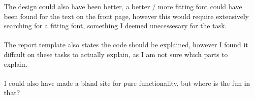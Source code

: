 \documentclass[a4paper]{scrartcl}
\begin{document}
\noindent
The design could also have been better, a better / more fitting font could have been found for the
text on the front page, however this would require extensively searching for a fitting font,
something I deemed unecessesary for the task.\\\\

\noindent
The report template also states the code should be explained, however I found it diffcult
on these tasks to actually explain, as I am not sure which parts to explain.\\\\

\noindent
I could also have made a bland site for
pure functionality, but where is the fun in that?
\end{document}

